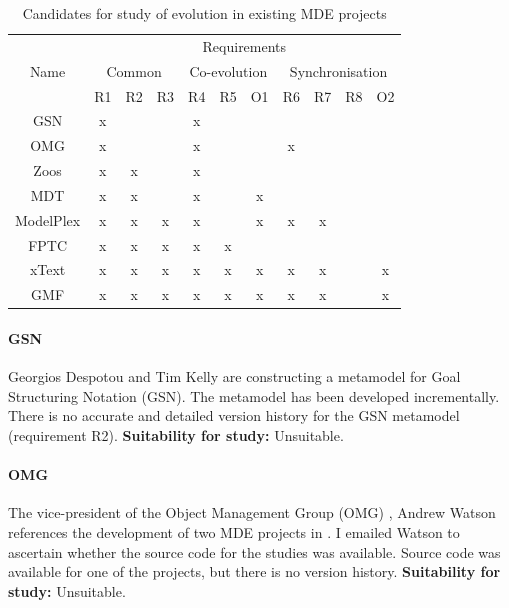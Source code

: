 \begin{table}
	\caption{Candidates for study of evolution in existing MDE projects}
	\centering
	\begin{tabular}{|c||c|c|c||c|c|c||c|c|c|c|}
		\hline
		\multirow{3}{*}{Name} & \multicolumn{10}{|c|}{Requirements} \\
		\cline{2-11}
		          & \multicolumn{3}{|c||}{Common} & \multicolumn{3}{|c||}{Co-evolution} & \multicolumn{4}{|c|}{Synchronisation} \\
		\cline{2-11}
		          & R1 & R2 & R3 & R4 & R5 & O1 & R6 & R7 & R8 & O2 \\
		\hline
		GSN       & x  &    &    & x  &    &    &    &    &    &    \\
		\hline
		OMG       & x  &    &    & x  &    &    & x  &    &    &    \\
		\hline
		Zoos      & x  & x  &    & x  &    &    &    &    &    &    \\
		\hline
		MDT       & x  & x  &    & x  &    & x  &    &    &    &    \\
		\hline
		ModelPlex & x  & x  & x  & x  &    & x  & x  & x  &    &    \\
		\hline
		FPTC      & x  & x  & x  & x  & x  &    &    &    &    &    \\
		\hline
		xText     & x  & x  & x  & x  & x  & x  & x  & x  &    & x  \\
		\hline
		GMF       & x  & x  & x  & x  & x  & x  & x  & x  &    & x  \\
		\hline
	\end{tabular}
	\label{tab:candidates}
\end{table}

\paragraph{GSN} %
\label{par:gsn}
Georgios Despotou and Tim Kelly are constructing a metamodel for Goal Structuring Notation (GSN). The metamodel has been developed incrementally. There is no accurate and detailed version history for the GSN metamodel (requirement R2). \textbf{Suitability for study:} Unsuitable.

\paragraph{OMG} %
\label{par:omg}
The vice-president of the Object Management Group (OMG) \cite{omg}, Andrew Watson references the development of two MDE projects in \cite{watson08mdahistory}. I emailed Watson to ascertain whether the source code for the studies was available. Source code was available for one of the projects, but there is no version history. \textbf{Suitability for study:} Unsuitable.

